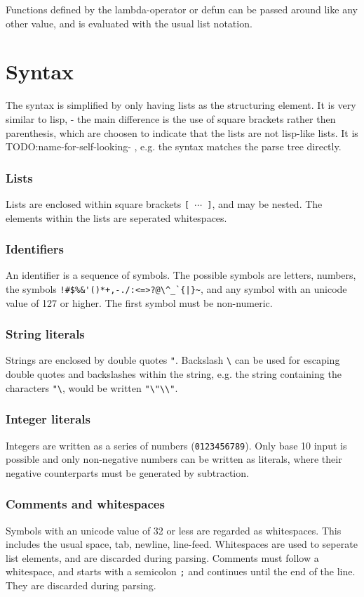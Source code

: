 Functions defined by the lambda-operator or defun can be passed around like any other value, and is evaluated with the usual list notation.

\section{Syntax}
The syntax is simplified by only having lists as the structuring element.
It is very similar to lisp, - the main difference is the use of square brackets rather then parenthesis, which are choosen to indicate that the lists are not lisp-like lists.
It is TODO:name-for-self-looking- , e.g. the syntax matches the parse tree directly.

\subsubsection{Lists}
Lists are enclosed within square brackets \verb|[ |$\cdots$\verb| ]|, and may be nested. The elements within the lists are seperated whitespaces.

\subsubsection{Identifiers}
An identifier is a sequence of symbols. The possible symbols are letters, numbers, the symbols \verb]!#$%&'()*+,-./:<=>?@\^_`{|}~], and any symbol with an unicode value of 127 or higher. The first symbol must be non-numeric.

\subsubsection{String literals}
Strings are enclosed by double quotes \verb|"|. Backslash \verb|\| can be used for escaping double quotes and backslashes within the string, e.g. the string containing the characters \verb|"\|, would be written \verb|"\"\\"|.

\subsubsection{Integer literals}
Integers are written as a series of numbers (\verb|0123456789|). Only base 10 input is possible and only non-negative numbers can be written as literals, where their negative counterparts must be generated by subtraction.

\subsubsection{Comments and whitespaces}
Symbols with an unicode value of 32 or less are regarded as whitespaces. This includes the usual space, tab, newline, line-feed. Whitespaces are used to seperate list elements, and are discarded during parsing.
Comments must follow a whitespace, and starts with a semicolon \verb|;| and continues until the end of the line. They are discarded during parsing. 

